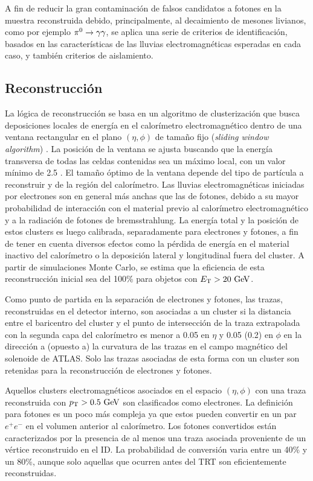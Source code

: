 A fin de reducir la gran contaminación de falsos candidatos a fotones en la
muestra reconstruida debido, principalmente, al decaimiento de mesones livianos,
como por ejemplo $\pi^0 \to \gam\gam$, se aplica una serie de criterios de
identificación, basados en las características de las lluvias electromagnéticas
esperadas en cada caso, y también criterios de aislamiento.


\subsection{Reconstrucción}

La lógica de reconstrucción se basa en un algoritmo de clusterización que busca
deposiciones locales de energía en el calorímetro electromagnético dentro de una
ventana rectangular en el plano $(\eta, \phi)$ de tamaño fijo (\emph{sliding
  window algorithm}) \cite{Delmastro:1747242}. La posición de la ventana se
ajusta buscando que la energía transversa de todas las celdas contenidas sea un
máximo local, con un valor mínimo de 2.5 \gev. El tamaño óptimo de la ventana depende
del tipo de partícula a reconstruir y de la región del calorímetro. Las lluvias
electromagnéticas iniciadas por electrones son en general más anchas que las de
fotones, debido a su mayor probabilidad de interacción con el material previo al
calorímetro electromagnético y a la radiación de fotones de bremsstrahlung. La
energía total y la posición de estos clusters es luego calibrada, separadamente
para electrones y fotones, a fin de tener en cuenta diversos efectos como la
pérdida de energía en el material inactivo del calorímetro o la deposición
lateral y longitudinal fuera del cluster. A partir de simulaciones Monte Carlo,
se estima que la eficiencia de esta reconstrucción inicial sea del 100\% para
objetos con $\et > 20 \gev$.

Como punto de partida en la separación de electrones y fotones, las trazas,
reconstruidas en el detector interno, son asociadas a un cluster si la distancia
entre el baricentro del cluster y el punto de intersección de la traza
extrapolada con la segunda capa del calorímetro es menor a 0.05 en $\eta$ y 0.05
(0.2) en $\phi$ en la dirección a (opuesto a) la curvatura de las trazas en el
campo magnético del solenoide de ATLAS. Solo las trazas asociadas de esta forma
con un cluster son retenidas para la reconstrucción de electrones y fotones.

Aquellos clusters electromagnéticos asociados en el espacio $(\eta,\phi)$ con
una traza reconstruida con $\pt > 0.5 \gev$ son clasificados como electrones. La
definición para fotones es un poco más compleja ya que estos pueden convertir en
un par $e^+e^-$ en el volumen anterior al calorímetro. Los fotones convertidos
están caracterizados por la presencia de al menos una traza asociada proveniente
de un vértice reconstruido en el ID. La probabilidad de conversión varia entre
un 40\% y un 80\%, aunque solo aquellas que ocurren antes del TRT son
eficientemente reconstruidas.

